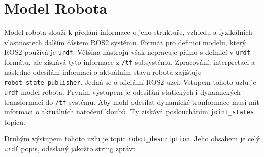 \section{Model Robota}
Model robota slouží k předání informace o jeho struktuře, vzhledu a fyzikálních vlastnostech dalším částem ROS2 systému. Formát pro definici modelu, který ROS2 používá je \verb|urdf|. Většina nástrojů však nepracuje přímo s definicí v \verb|urdf| formátu, ale získává tyto informace z \verb|/tf| subsystému. Zpracování, interpretaci a následné odesílání informací o aktuálním stavu robota zajišťuje \verb|robot_state_publisher|. Jedná se o oficiální ROS2 uzel. Vstupem tohoto uzlu je \verb|urdf| model robota. Prvním výstupem je odesílání statických i dynamických transformací do \verb|/tf| systému. Aby mohl odesílat dynamické tranformace musí mít informaci o aktuálních natočení kloubů. Ty získává posloucháním \verb|joint_states| topicu.

Druhým výstupem tohoto uzlu je topic \verb|robot_description|. Jeho obsahem je celý \verb|urdf| popis, odeslaný jakožto string zpráva.

